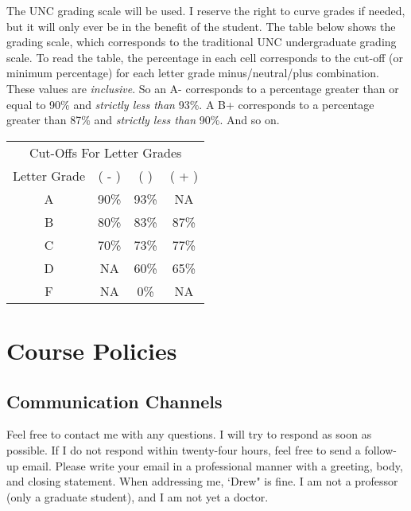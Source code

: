 \documentclass[11pt]{article}
\begin{document}
The UNC grading scale will be used. I reserve the right to curve grades if needed, but it will only ever be in the benefit of the student. The table below shows the grading scale, which corresponds to the traditional UNC undergraduate grading scale. To read the table, the percentage in each cell corresponds to the cut-off (or minimum percentage) for each letter grade minus/neutral/plus combination. These values are \textit{inclusive}. So an A- corresponds to a percentage greater than or equal to 90\% and \textit{strictly less than} 93\%. A B+ corresponds to a percentage greater than 87\% and \textit{strictly less than} 90\%. And so on. 

\begin{table}[H]
\centering
\begin{tabular}{@{}cccc@{}} \toprule
\multicolumn{4}{c}{Cut-Offs For Letter Grades} \\ \cmidrule(r){1-4}
Letter Grade & ( - ) & (  ) & ( + ) \\ \midrule
A & 90\% & 93\% & NA \\ 
B & 80\% & 83\% & 87\% \\
C & 70\% & 73\% & 77\% \\
D & NA & 60\% & 65\% \\
F & NA & 0\% & NA \\ \bottomrule
\end{tabular}
\end{table}



  
\newpage


\section*{Course Policies}\label{sec:Policies}

\subsection*{Communication Channels}
Feel free to contact me with any questions. I will try to respond as soon as possible. If I do not respond within twenty-four hours, feel free to send a follow-up email. Please write your email in a professional manner with a greeting, body, and closing statement. When addressing me, `Drew" is fine. I am not a professor (only a graduate student), and I am not yet a doctor. 
\end{document}

